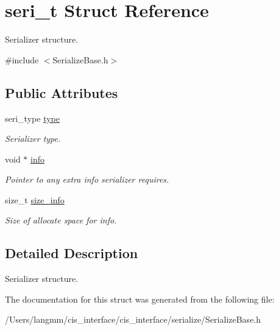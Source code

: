 \hypertarget{structseri__t}{}\section{seri\+\_\+t Struct Reference}
\label{structseri__t}


Serializer structure.  




{\ttfamily \#include $<$Serialize\+Base.\+h$>$}

\subsection*{Public Attributes}
\begin{DoxyCompactItemize}
\item 
\mbox{\label{structseri__t_a4278a7440cc158eb8c28010c5ad73724}} 
seri\+\_\+type \mbox{\hyperlink{structseri__t_a4278a7440cc158eb8c28010c5ad73724}{type}}
\begin{DoxyCompactList}\small\item\em Serializer type. \end{DoxyCompactList}\item 
\mbox{\label{structseri__t_afe8d056809d1f3155b50603a620a52ab}} 
void $\ast$ \mbox{\hyperlink{structseri__t_afe8d056809d1f3155b50603a620a52ab}{info}}
\begin{DoxyCompactList}\small\item\em Pointer to any extra info serializer requires. \end{DoxyCompactList}\item 
\mbox{\label{structseri__t_a6cf49790453343f2ebb5690b68342ac1}} 
size\+\_\+t \mbox{\hyperlink{structseri__t_a6cf49790453343f2ebb5690b68342ac1}{size\+\_\+info}}
\begin{DoxyCompactList}\small\item\em Size of allocate space for info. \end{DoxyCompactList}\end{DoxyCompactItemize}


\subsection{Detailed Description}
Serializer structure. 

The documentation for this struct was generated from the following file\+:\begin{DoxyCompactItemize}
\item 
/\+Users/langmm/cis\+\_\+interface/cis\+\_\+interface/serialize/Serialize\+Base.\+h\end{DoxyCompactItemize}
